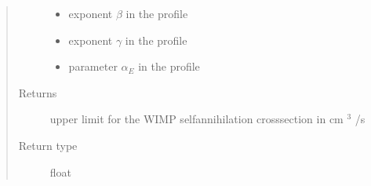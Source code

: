 \documentclass[letterpaper,10pt,english]{sphinxmanual}
\begin{document}
\begin{fulllineitems}
\begin{quote}
\begin{description}
\begin{itemize}
\item {} 
\sphinxAtStartPar
{} \textendash{} exponent \(\beta\) in the {\hyperref[\detokenize{diffsph.profiles:diffsph.profiles.templates.hdz}]{}} profile

\item {} 
\sphinxAtStartPar
{} \textendash{} exponent \(\gamma\) in the {\hyperref[\detokenize{diffsph.profiles:diffsph.profiles.templates.hdz}]{}} profile

\item {} 
\sphinxAtStartPar
{} \textendash{} parameter \(\alpha_E\) in the {\hyperref[\detokenize{diffsph.profiles:diffsph.profiles.templates.enst}]{}} profile

\end{itemize}

\item[{Returns}] \leavevmode
\sphinxAtStartPar
upper limit for the WIMP self\sphinxhyphen{}annihilation cross\sphinxhyphen{}section in cm \({}^3\) /s

\item[{Return type}] \leavevmode
\sphinxAtStartPar
float

\end{description}\end{quote}

\end{fulllineitems}

\end{document}
